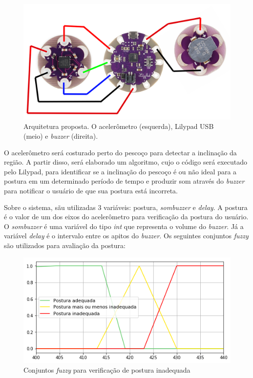 \documentclass[12pt]{article}
\begin{document}
\begin{figure}[ht]
\centering
\includegraphics[width=.8\textwidth]{diagrama_conexao.png}
\caption{Arquitetura proposta. O acelerômetro (esquerda), Lilypad USB (meio) e \textit{buzzer} (direita).}
\label{fig:example3}
\end{figure}

O acelerômetro será costurado perto do pescoço para detectar a inclinação da região. A partir disso, será elaborado um algoritmo, cujo o código será executado pelo Lilypad, para identificar se a inclinação do pescoço é ou não ideal para a postura em um determinado período de tempo e produzir som através do \textit{buzzer} para notificar o usuário de que sua postura está incorreta.

Sobre o sistema, sãu utilizadas 3 variáveis: postura, \textit{sombuzzer} e \textit{delay}. A postura é o valor de um dos eixos do acelerômetro para verificação da postura do usuário. O \textit{sombuzzer} é uma variável do tipo \textit{int} que representa o volume do \textit{buzzer}. Já a variável \textit{delay} é o intervalo entre os apitos do \textit{buzzer}. Os seguintes conjuntos \textit{fuzzy} são utilizados para avaliação da postura:\newline

\begin{figure}[ht]
    \centering
    \includegraphics[width=.7\textwidth]{download.png}
    \caption{Conjuntos \textit{fuzzy} para verificação de postura inadequada}
    \label{fig:fuzzy1}
\end{figure}
\end{document}
